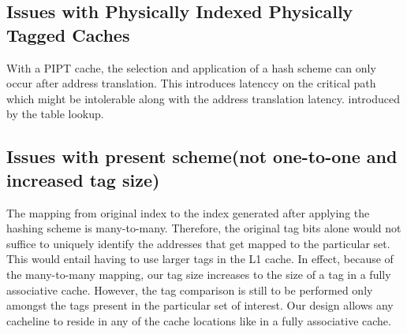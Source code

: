 \subsection{Issues with Physically Indexed Physically Tagged Caches}
With a PIPT cache, the selection and application of a hash scheme can only occur after address translation. This introduces latenccy on the critical path which might be intolerable along with the address translation latency.
introduced by the table lookup. 


\subsection{Issues with present scheme(not one-to-one and increased tag size)}
The mapping from original index to the index generated after applying the hashing scheme is many-to-many. Therefore, the original tag bits alone would not suffice to uniquely identify the addresses that get mapped to the particular set. This would entail having to use larger tags in the L1 cache. In effect, because of the many-to-many mapping, our tag size increases to the size of a tag in a fully associative cache. However, the tag comparison is still to be performed only amongst the tags present in the particular set of interest. Our design allows any cacheline to reside in any of the cache locations like in a fully associative cache.  

